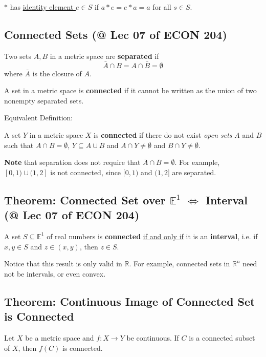 \documentclass[11pt]{elegantbook}
\begin{document}
\begin{definition}
$*$ has \underline{identity element $e\in S$} if $a*e=e*a=a$ for all $s\in S$.
\end{definition}

\subsection{Connected Sets \small{(@ Lec 07 of ECON 204)}}
\begin{definition}
    \normalfont
    Two sets $A, B$ in a metric space are \textbf{separated} if $$\bar{A}\cap B=A\cap\bar{B}=\emptyset$$
    where $\bar{A}$ is the closure of $A$.

    A set in a metric space is \textbf{connected} if it cannot be written as the union of two nonempty separated sets.
\end{definition}
Equivalent Definition:
\begin{definition}
    \normalfont
    A set $Y$ in a metric space $X$ is \textbf{connected} if there do not exist \textit{open sets} $A$ and $B$ such that $A \cap B = \emptyset$, $Y \subseteq A\cup B$ and $A \cap Y \neq \emptyset$ and $B \cap Y \neq \emptyset$.
\end{definition}

\textbf{Note} that separation does not require that $\bar{A}\cap\bar{B}=\emptyset$. For example, $[0,1)\cup(1,2]$ is not connected, since $[0,1)$ and $(1,2]$ are separated.

\subsection{Theorem: Connected Set over $\mathbb{E}^1$ $\Leftrightarrow$ Interval \small{(@ Lec 07 of ECON 204)}}
\begin{theorem}
    A set $S \subseteq \mathbb{E}^1$ of real numbers is \textbf{connected} \underline{if and only if} it is an \textbf{interval}, i.e. if $x, y \in S$ and $z \in (x, y)$, then $z \in S$.
\end{theorem}
Notice that this result is only valid in $\mathbb{R}$. For example, connected sets in $\mathbb{R}^n$ need not be intervals, or even convex.

\subsection{Theorem: Continuous Image of Connected Set is Connected}
\begin{theorem}
    Let $X$ be a metric space and $f : X \rightarrow Y$ be continuous. If $C$ is a connected subset of $X$, then $f(C)$ is connected.
\end{theorem}
\end{document}
